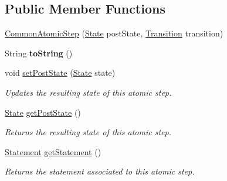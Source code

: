 \subsection*{Public Member Functions}
\begin{DoxyCompactItemize}
\item 
\hyperlink{classedu_1_1udel_1_1cis_1_1vsl_1_1civl_1_1kripke_1_1common_1_1CommonAtomicStep_a4934d6294bde0745d0403601892cb3a8}{Common\+Atomic\+Step} (\hyperlink{interfaceedu_1_1udel_1_1cis_1_1vsl_1_1civl_1_1state_1_1IF_1_1State}{State} post\+State, \hyperlink{interfaceedu_1_1udel_1_1cis_1_1vsl_1_1civl_1_1semantics_1_1IF_1_1Transition}{Transition} transition)
\item 
\hypertarget{classedu_1_1udel_1_1cis_1_1vsl_1_1civl_1_1kripke_1_1common_1_1CommonAtomicStep_a80190ae64e002a85c9a0fc3827610ab1}{}String {\bfseries to\+String} ()\label{classedu_1_1udel_1_1cis_1_1vsl_1_1civl_1_1kripke_1_1common_1_1CommonAtomicStep_a80190ae64e002a85c9a0fc3827610ab1}

\item 
void \hyperlink{classedu_1_1udel_1_1cis_1_1vsl_1_1civl_1_1kripke_1_1common_1_1CommonAtomicStep_a65505f67963263c3f224ae452107f8fa}{set\+Post\+State} (\hyperlink{interfaceedu_1_1udel_1_1cis_1_1vsl_1_1civl_1_1state_1_1IF_1_1State}{State} state)
\begin{DoxyCompactList}\small\item\em Updates the resulting state of this atomic step. \end{DoxyCompactList}\item 
\hyperlink{interfaceedu_1_1udel_1_1cis_1_1vsl_1_1civl_1_1state_1_1IF_1_1State}{State} \hyperlink{classedu_1_1udel_1_1cis_1_1vsl_1_1civl_1_1kripke_1_1common_1_1CommonAtomicStep_a0eb7df223fc8700853be108c8906bdc8}{get\+Post\+State} ()
\begin{DoxyCompactList}\small\item\em Returns the resulting state of this atomic step. \end{DoxyCompactList}\item 
\hyperlink{interfaceedu_1_1udel_1_1cis_1_1vsl_1_1civl_1_1model_1_1IF_1_1statement_1_1Statement}{Statement} \hyperlink{classedu_1_1udel_1_1cis_1_1vsl_1_1civl_1_1kripke_1_1common_1_1CommonAtomicStep_ae4b90e4bf747f5d02088ff9b274bb649}{get\+Statement} ()
\begin{DoxyCompactList}\small\item\em Returns the statement associated to this atomic step. \end{DoxyCompactList}\end{DoxyCompactItemize}


